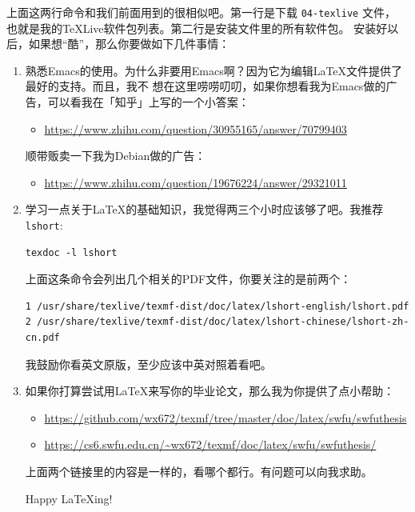 \documentclass{wx672ctexart} \usepackage{hyperref}
\begin{document}
上面这两行命令和我们前面用到的很相似吧。第一行是下载 \texttt{04-texlive} 文件，
也就是我的TeXLive软件包列表。第二行是安装文件里的所有软件包。
安装好以后，如果想“酷”，那么你要做如下几件事情：
\begin{enumerate}
\item 熟悉Emacs的使用。为什么非要用Emacs啊？因为它为编辑\LaTeX{}文件提供了最好的支持。而且，我不
想在这里唠唠叨叨，如果你想看我为Emacs做的广告，可以看我在「知乎」上写的一个小答案：
\begin{itemize}
\item \url{https://www.zhihu.com/question/30955165/answer/70799403}
\end{itemize}

顺带贩卖一下我为Debian做的广告：
\begin{itemize}
\item \url{https://www.zhihu.com/question/19676224/answer/29321011}
\end{itemize}

\item 学习一点关于\LaTeX{}的基础知识，我觉得两三个小时应该够了吧。我推荐 \texttt{lshort}:
\begin{verbatim}
texdoc -l lshort
\end{verbatim}

上面这条命令会列出几个相关的PDF文件，你要关注的是前两个：
\begin{verbatim}
1 /usr/share/texlive/texmf-dist/doc/latex/lshort-english/lshort.pdf
2 /usr/share/texlive/texmf-dist/doc/latex/lshort-chinese/lshort-zh-cn.pdf
\end{verbatim}

我鼓励你看英文原版，至少应该中英对照着看吧。
\item 如果你打算尝试用\LaTeX{}来写你的毕业论文，那么我为你提供了点小帮助：
\begin{itemize}
\item \url{https://github.com/wx672/texmf/tree/master/doc/latex/swfu/swfuthesis}
\item \url{https://cs6.swfu.edu.cn/\~wx672/texmf/doc/latex/swfu/swfuthesis/}
\end{itemize}
上面两个链接里的内容是一样的，看哪个都行。有问题可以向我求助。

Happy LaTeXing!
\end{enumerate}
\end{document}
